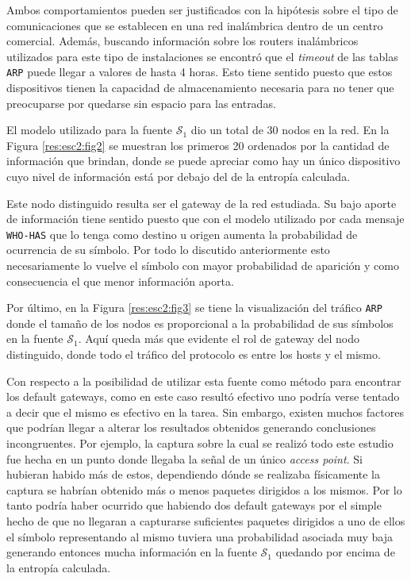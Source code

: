 Ambos comportamientos pueden ser justificados con la hipótesis sobre el tipo de
comunicaciones que se establecen en una red inalámbrica dentro de un centro
comercial. Además, buscando información sobre los routers inalámbricos
utilizados para este tipo de instalaciones se encontró que el \emph{timeout} de
las tablas \texttt{ARP} puede llegar a valores de hasta 4 horas. Esto tiene
sentido puesto que estos dispositivos tienen la capacidad de almacenamiento
necesaria para no tener que preocuparse por quedarse sin espacio para las
entradas.

El modelo utilizado para la fuente $\mathcal{S}_1$ dio un total de 30 nodos en la
red. En la Figura \ref{res:esc2:fig2} se muestran los primeros 20 ordenados por
la cantidad de información que brindan, donde se puede apreciar como hay un
único dispositivo cuyo nivel de información está por debajo del de la entropía
calculada.

Este nodo distinguido resulta ser el gateway de la red estudiada. Su bajo aporte
de información tiene sentido puesto que con el modelo utilizado por cada mensaje
\texttt{WHO-HAS} que lo tenga como destino u origen aumenta la probabilidad de
ocurrencia de su símbolo. Por todo lo discutido anteriormente esto
necesariamente lo vuelve el símbolo con mayor probabilidad de aparición y como
consecuencia el que menor información aporta.

Por último, en la Figura \ref{res:esc2:fig3} se tiene la visualización del
tráfico \texttt{ARP} donde el tamaño de los nodos es proporcional a la
probabilidad de sus símbolos en la fuente $\mathcal{S}_1$. Aquí queda más que
evidente el rol de gateway del nodo distinguido, donde todo el tráfico del
protocolo es entre los hosts y el mismo.

Con respecto a la posibilidad de utilizar esta fuente como método para encontrar
los default gateways, como en este caso resultó efectivo uno podría verse
tentado a decir que el mismo es efectivo en la tarea. Sin embargo, existen muchos
factores que podrían llegar a alterar los resultados obtenidos generando
conclusiones incongruentes. Por ejemplo, la captura sobre la cual se realizó
todo este estudio fue hecha en un punto donde llegaba la señal de un único
\emph{access point}. Si hubieran habido más de estos, dependiendo dónde se
realizaba físicamente la captura se habrían obtenido más o menos paquetes
dirigidos a los mismos. Por lo tanto podría haber ocurrido que habiendo dos
default gateways por el simple hecho de que no llegaran a capturarse suficientes
paquetes dirigidos a uno de ellos el símbolo representando al mismo tuviera una
probabilidad asociada muy baja generando entonces mucha información en la fuente
$\mathcal{S}_1$ quedando por encima de la entropía calculada.

